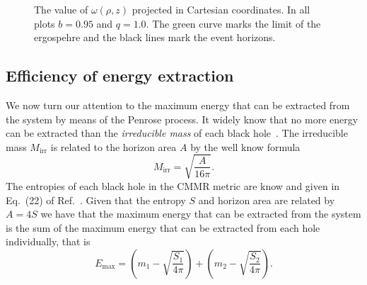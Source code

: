 \begin{figure}
{    \label{ch:penrose_binaries/fig:omega_dens_c}
  }
  \caption{The value of $\omega(\rho,z)$ projected in Cartesian coordinates. In all plots $b=0.95$ and $q=1.0$. The green curve marks the limit of the ergospehre and the black lines mark the event horizons.}
  \label{ch:penrose_binaries/fig:omega_value_regions}
\end{figure}

\subsection{Efficiency of energy extraction}

We now turn our attention to the maximum energy that can be extracted from the system by means of the Penrose process. It widely know that no more energy can be extracted than the \textit{irreducible mass} of each black hole~\cite{RUFFINI1971,CHRISTODOULOU1970,carroll}. The irreducible mass $M_{\text{irr}}$ is related to the horizon area $A$ by the well know formula~\cite{carroll}
%
\begin{equation}
  M_{\text{irr}} = \sqrt{\frac{A}{16\pi}}.
  \label{ch:penrose_binaries/eq:irreducible_mass}
\end{equation}
%
The entropies of each black hole in the CMMR metric are know and given in Eq.~(22) of Ref.~\cite{MANKO2020}. Given that the entropy $S$ and horizon area are related by $A=4S$ we have that the maximum energy that can be extracted from the system is the sum of the maximum energy that can be extracted from each hole individually, that is
%
\begin{equation}
  E_{\text{max}} = \left(m_1 - \sqrt{\frac{S_1}{4\pi}}\right) + \left(m_2 - \sqrt{\frac{S_2}{4\pi}}\right).
  \label{ch:penrose_binaries/eq:max_extract_energy}
\end{equation}

